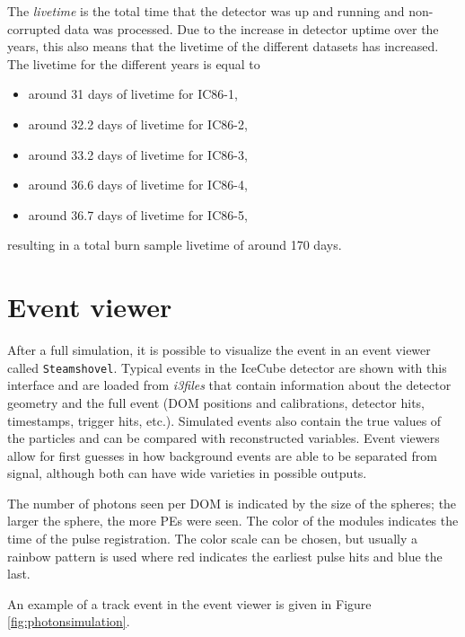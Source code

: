 \noindent The \textit{livetime} is the total time that the detector was up and running and non-corrupted data was processed. Due to the increase in detector uptime over the years, this also means that the livetime of the different datasets has increased. The livetime for the different years is equal to
\vspace{2mm}
\begin{itemize}
\item around 31 days of livetime for IC86-1,
\item around 32.2 days of livetime for IC86-2,
\item around 33.2 days of livetime for IC86-3,
\item around 36.6 days of livetime for IC86-4,
\item around 36.7 days of livetime for IC86-5,
\end{itemize}
\vspace{2mm}

\noindent resulting in a total burn sample livetime of around 170 days.

\section{Event viewer}
After a full simulation, it is possible to visualize the event in an event viewer called \texttt{Steamshovel}. Typical events in the IceCube detector are shown with this interface and are loaded from \textit{i3files} that contain information about the detector geometry and the full event (DOM positions and calibrations, detector hits, timestamps, trigger hits, etc.). Simulated events also contain the true values of the particles and can be compared with reconstructed variables. Event viewers allow for first guesses in how background events are able to be separated from signal, although both can have wide varieties in possible outputs.

The number of photons seen per DOM is indicated by the size of the spheres; the larger the sphere, the more PEs were seen. The color of the modules indicates the time of the pulse registration. The color scale can be chosen, but usually a rainbow pattern is used where red indicates the earliest pulse hits and blue the last. 

An example of a track event in the event viewer is given in Figure \ref{fig:photonsimulation}.
